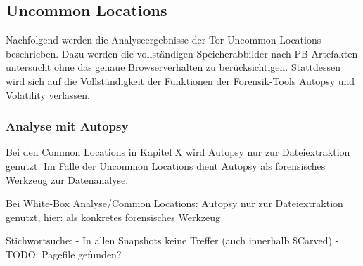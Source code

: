 \subsection*{Uncommon Locations}
Nachfolgend werden die Analyseergebnisse der Tor Uncommon Locations beschrieben.
Dazu werden die vollständigen Speicherabbilder nach PB Artefakten untersucht ohne das genaue Browserverhalten zu berücksichtigen. Stattdessen wird sich auf die Vollständigkeit der Funktionen der Forensik-Tools Autopsy und Volatility verlassen.

\subsubsection*{Analyse mit Autopsy}

			Bei den Common Locations in Kapitel X wird Autopsy nur zur Dateiextraktion genutzt. Im Falle der Uncommon Locations dient Autopsy als forensisches Werkzeug zur Datenanalyse.

Bei White-Box Analyse/Common Locations: Autopsy nur zur Dateiextraktion genutzt, hier: als konkretes forensisches Werkzeug

Stichwortsuche:
- In allen Snapshots keine Treffer (auch innerhalb \$Carved)
- TODO: Pagefile gefunden?

